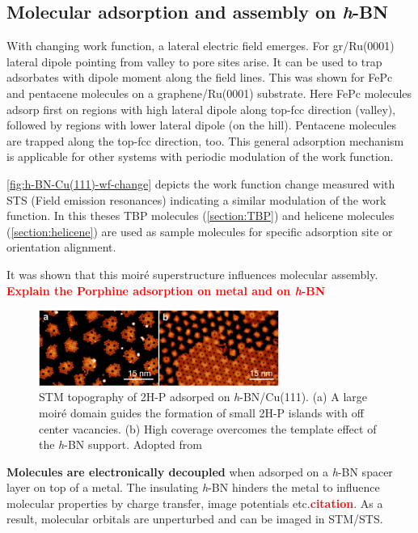 \subsection{Molecular adsorption and assembly on \textit{h}-BN}
\label{section:Mol-on-h-BN}
With changing work function, a lateral electric field emerges. For gr/Ru(0001) lateral dipole pointing from valley to pore sites arise.\cite{zhang_assembly_2011} It can be used to trap adsorbates with dipole moment along the field lines. This was shown for FePc and pentacene molecules on a graphene/Ru(0001) substrate. Here FePc molecules adsorp first on regions with high lateral dipole along top-fcc direction (valley), followed by regions with lower lateral dipole (on the hill). Pentacene molecules are trapped along the top-fcc direction, too.\cite{zhang_assembly_2011}  This general adsorption mechanism is applicable for other systems with periodic modulation of the work function.

\autoref{fig:h-BN-Cu(111)-wf-change} depicts the work function change measured with STS (Field emission resonances) indicating a similar modulation of the work function. In this theses TBP molecules (\autoref{section:TBP}) and helicene molecules (\autoref{section:helicene}) are used as sample molecules for specific adsorption site or orientation alignment.

It was shown that this moir\'e superstructure influences molecular assembly. 
\textcolor{red}{\textbf{Explain the Porphine adsorption on metal and on \textit{h}-BN}}

\begin{figure} \centering
	\includegraphics[width=0.7\textwidth]{./images/2H-P-hBN-Cu111-joshi}%
	\caption{STM topography of 2H-P adsorped on \textit{h}-BN/Cu(111). (a) A large moir\'e domain guides the formation of small 2H-P islands with off center vacancies. (b) High coverage overcomes the template effect of the \textit{h}-BN support. Adopted from \cite{diss-joshi}}
	\label{fig:2H-P-hBN-Cu111-joshi}
\end{figure}

\textbf{Molecules are electronically decoupled} when adsorped on a \textit{h}-BN spacer layer on top of a metal. The insulating \textit{h}-BN hinders the metal to influence molecular properties by charge transfer, image potentials etc.\textcolor{red}{\textbf{citation}}. As a result, molecular orbitals are unperturbed and can be imaged in STM/STS.